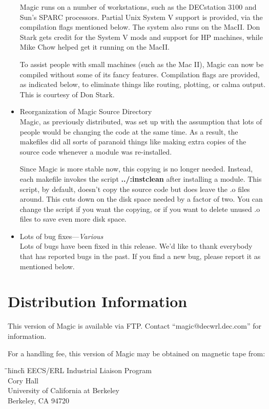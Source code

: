 \documentclass[letterpaper,twoside,12pt]{article}
\def\hinch{\hspace*{0.5in}}
\def\starti{\begin{center}\begin{tabbing}\hinch\=\hinch\=\hinch\=hinch\hinch\=\kill}
\def\endi{\end{tabbing}\end{center}}
\def\ii{\>\>\>}
\begin{document}
\begin{itemize}
Magic runs on a number of workstations, such as the DECstation 3100 and Sun's
SPARC processors.  Partial Unix System V support is provided, via the 
compilation flags mentioned below.  The system also runs on the MacII.
Don Stark gets credit for the System V mods and support for HP machines, while
Mike Chow helped get it running on the MacII.

To assist people with small machines (such as the Mac II), Magic can now be
compiled without some of its fancy features.  Compilation flags are provided,
as indicated below, to eliminate things like routing, plotting, or calma output.
This is courtesy of Don Stark.

\item Reorganization of Magic Source Directory \\
Magic, as previously distributed, was set up with the assumption that lots of
people would be changing the code at the same time.  As a result, the makefiles
did all sorts of paranoid things like making extra copies of the source code
whenever a module was re-installed.  

Since Magic is more stable now, this copying is no longer needed.  Instead,
each makefile invokes the script {\bfseries ../:instclean} after installing a module.
This script,
by default, doesn't copy the source code but does leave the .o files around.
This cuts down on the disk space needed by a factor of two.
You can change the script if you want the copying, 
or if you want to delete unused .o files to save even more disk space.

\item Lots of bug fixes---{\itshape Various} \\
Lots of bugs have been fixed in this release.  We'd like to thank everybody
that has reported bugs in the past.  If you find a new bug, please report
it as mentioned below.
\end{itemize}

\section{Distribution Information}

This version of Magic is available via FTP.  Contact
``{\ttfamily magic@decwrl.dec.com}'' for information.

For a handling fee, this version of Magic may be obtained on magnetic tape from:

\starti
   \ii EECS/ERL Industrial Liaison Program \\
   \ii 479 Cory Hall \\
   \ii University of California at Berkeley \\
   \ii Berkeley, CA  94720
\endi
\end{document}
